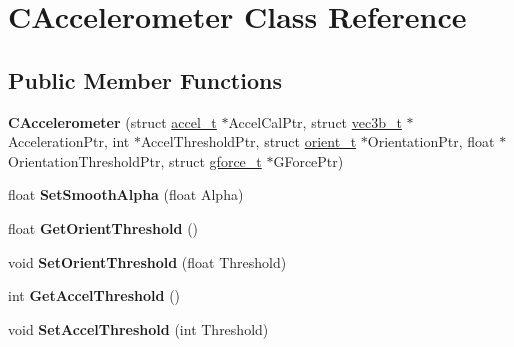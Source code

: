 \hypertarget{class_c_accelerometer}{\section{\-C\-Accelerometer \-Class \-Reference}
\label{class_c_accelerometer}
}
\subsection*{\-Public \-Member \-Functions}
\begin{DoxyCompactItemize}
\item 
\hypertarget{class_c_accelerometer_ac6a043c178545a10a47134638ab243df}{{\bfseries \-C\-Accelerometer} (struct \hyperlink{structaccel__t}{accel\-\_\-t} $\ast$\-Accel\-Cal\-Ptr, struct \hyperlink{structvec3b__t}{vec3b\-\_\-t} $\ast$\-Acceleration\-Ptr, int $\ast$\-Accel\-Threshold\-Ptr, struct \hyperlink{structorient__t}{orient\-\_\-t} $\ast$\-Orientation\-Ptr, float $\ast$\-Orientation\-Threshold\-Ptr, struct \hyperlink{structgforce__t}{gforce\-\_\-t} $\ast$\-G\-Force\-Ptr)}\label{class_c_accelerometer_ac6a043c178545a10a47134638ab243df}

\item 
\hypertarget{class_c_accelerometer_a09ce4dcabd897c0231569ebc9f476e6b}{float {\bfseries \-Set\-Smooth\-Alpha} (float \-Alpha)}\label{class_c_accelerometer_a09ce4dcabd897c0231569ebc9f476e6b}

\item 
\hypertarget{class_c_accelerometer_a5d4a662244592cf20751711c298781e5}{float {\bfseries \-Get\-Orient\-Threshold} ()}\label{class_c_accelerometer_a5d4a662244592cf20751711c298781e5}

\item 
\hypertarget{class_c_accelerometer_a4a5f3f55dce8a3a8a049ee38c121e00e}{void {\bfseries \-Set\-Orient\-Threshold} (float \-Threshold)}\label{class_c_accelerometer_a4a5f3f55dce8a3a8a049ee38c121e00e}

\item 
\hypertarget{class_c_accelerometer_a51262cabf03ac689875b6cb37f27f253}{int {\bfseries \-Get\-Accel\-Threshold} ()}\label{class_c_accelerometer_a51262cabf03ac689875b6cb37f27f253}

\item 
\hypertarget{class_c_accelerometer_a8e2e5501d5d151558206eb61f0e24b99}{void {\bfseries \-Set\-Accel\-Threshold} (int \-Threshold)}\label{class_c_accelerometer_a8e2e5501d5d151558206eb61f0e24b99}


\end{DoxyCompactItemize}
